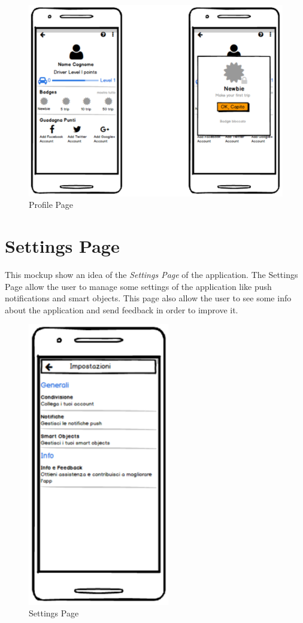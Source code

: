 \begin{figure}[htbp]
\centering
\includegraphics[width=\textwidth]{cpt/img/ProfilePage.png}
\caption{Profile Page}
\end{figure}

\clearpage
\section{Settings Page}
This mockup show an idea of the \textit{Settings Page} of the application. The Settings Page allow the user to manage some settings of the application like push notifications and smart objects. This page also allow the user to see some info about the application and send feedback in order to improve it.\\

\begin{figure}[htbp]
\centering
\includegraphics[width=0.55\textwidth]{cpt/img/SettingsPage.png}
\caption{Settings Page}
\end{figure}

